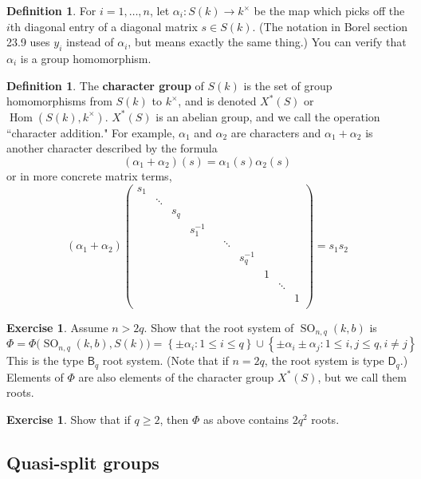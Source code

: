 \documentclass[12pt]{article}
\theoremstyle{definition}
\newtheorem{definition}[theorem]{Definition}
\newtheorem{exercise}[theorem]{Exercise}
\newcommand{\lb}{\left\{}
\newcommand{\rb}{\right\}}
\newcommand{\tbf}{\textbf}
\newcommand{\inv}{^{-1}}
\DeclareMathOperator{\Hom}{Hom}
\DeclareMathOperator{\SO}{SO}
\begin{document}
\begin{definition}
For $i = 1, \ldots, n$, let $\alpha_i:S(k) \to k^\times$ be the map which picks off the $i$th diagonal entry of a diagonal matrix $s \in S(k)$. (The notation in Borel \cite{Borel-LAG} section 23.9 uses $y_i$ instead of $\alpha_i$, but means exactly the same thing.) You can verify that $\alpha_i$ is a group homomorphism.
\end{definition}

\begin{definition}
The \tbf{character group} of $S(k)$ is the set of group homomorphisms from $S(k)$ to $k^\times$, and is denoted $X^*(S)$ or $\Hom(S(k), k^\times)$. $X^*(S)$ is an abelian group, and we call the operation ``character addition." For example, $\alpha_1$ and $\alpha_2$ are characters and $\alpha_1 + \alpha_2$ is another character described by the formula
\[
	(\alpha_1 + \alpha_2)(s) = \alpha_1(s) \alpha_2(s)
\]
or in more concrete matrix terms,
\[
	(\alpha_1 + \alpha_2)
	\begin{pmatrix}
		s_1 \\
		& \ddots \\
		&& s_q \\
		&&& s_1 \inv \\
		&&&&& \ddots \\
		&&&&&& s_q \inv \\
		&&&&&&& 1 \\
		&&&&&&&& \ddots \\
		&&&&&&&&& 1 \\
	\end{pmatrix}
	= s_1 s_2
\]
\end{definition}

\begin{exercise}
Assume $n > 2q$. Show that the root system of $\SO_{n,q}(k,b)$ is
\[
	\Phi = \Phi \Big( \SO_{n,q}(k,b), S(k) \Big) = \lb \pm \alpha_i : 1 \le i \le q \rb \cup \lb \pm \alpha_i \pm \alpha_j : 1 \le i,j \le q, i \neq j \rb
\]
This is the type $\mathsf{B}_q$ root system. (Note that if $n=2q$, the root system is type $\mathsf{D}_q$.) Elements of $\Phi$ are also elements of the character group $X^*(S)$, but we call them roots.
\end{exercise}

\begin{exercise}
Show that if $q \ge 2$, then $\Phi$ as above contains $2q^2$ roots.
\end{exercise}

\subsection{Quasi-split groups}
\end{document}

